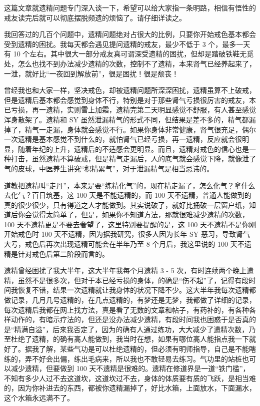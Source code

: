 \documentclass[fontset=founder]{ctexart}
\begin{document}
这篇文章就遗精问题专门深入谈一下，希望可以给大家指一条明路，相信有悟性的戒友读完后就可以彻底摆脱频遗的烦恼了。请仔细详读之。

我回答过的几百个问题中，遗精问题绝对占很大的比例，只要你开始戒色基本都会受到遗精的困扰。我每天都会遇见提问遗精的戒友，最少不低于 3 个，最多一天有 10 个左右。其中很大一部分戒友真可谓深受遗精的困扰，但却是踏破铁鞋无觅处，怎么也找不到办法减少遗精的次数，控制不了遗精，本来肾气已经养起来了，一泄，就好比“一夜回到解放前”，很是困扰！很是颓丧！

曾经我也和大家一样，坚决戒色，却被遗精问题所深深困扰，遗精虽算不上破戒，但是遗精后基本都会感觉到身体不行，特别是对于那些肾气亏损很厉害的戒友，本已亏损，再一遗精，实则雪上加霜，遗精完第二天明显感觉不舒服，有人甚至感觉浑身散架了。遗精和 SY 虽然泄漏精气的形式不同，但结果是差不多的，精气都漏掉了，精气一走漏，身体就会感觉不行。如果你身体非常健康，肾气很充足，偶尔一次遗精是基本感觉不到什么的，就怕肾气已经亏损，再一遗精，反应就会很明显，随着年纪的上升，遗精后的不适感会更明显。而且，遗精对戒色的信心也是一种打击，虽然遗精不算破戒，但是精气走漏后，人的底气就会感觉下降，就像泄了气的皮球，中医养生讲究“积精累气”，对于泄漏精气是相当忌讳的。

道教把遗精叫“走丹”，本来是要“练精化气”的，现在精走漏了，怎么化气？拿什么去化气？百日筑基，这 100 天是不能遗精的，而 100 天不遗精，普通人能做到的真的很少很少，只有得道之人才能做到。其实说破了，就好比捅破一层窗户纸，知道后你会觉得太简单了，但是，如果你不知道方法，那就很难减少遗精的次数，100 天不遗精更是不要去奢望了，这里特别要提醒的是，这 100 天不遗精不是你刚开始戒色时 100 天不遗精，因为据我研究，很多人因为长年 SY 恶习，导致肾气大亏，戒色后再次出现遗精可能会在半年乃至 8 个月后，我这里说的 100 天不遗精是针对戒色后第二阶段而言的。

遗精曾经困扰了我大半年，这大半年我每个月遗精 3 - 5 次，有时连续两个晚上遗精，虽然不是很多次，但对于本已经亏损的身体，的确是“伤不起”了，记得有段时间我恢复不错，结果一次遗精就让我身体的状况下降不少。这大半年我每次遗精都做记录，几月几号遗精的，在几点遗精的，有梦还是无梦，我都做了详细的记录，每次遗精后我都在网上找方法，真是看了无数的文章和帖子，有药补的，有各种各样动作的，有暗示疗法的，但还是没办法减少遗精，有段时间我也困惑于是否真的是“精满自溢”，后来我否定了，因为的确有人通过练功，大大减少了遗精次数，乃至杜绝了遗精，的确有高人能做到，我当时在想，如果有哪位高人能指点我一下就好了。据我了解，某些气功是可以杜绝遗精的，但必须有明师指导，自己是不能瞎练的，弄不好会出偏，练出毛病来，所以我也不敢轻易去练习。气功里的站桩也可以减少遗精，但要做到 100 天不遗精是很难的。遗精在修道界是一道“铁门槛”，不知有多少人过不去这道坎，这道坎过不去，身体的体质要有质的飞跃，是相当难的，因为你补进去的东西，都被你遗精漏掉了，好比水箱，上面放水，下面漏水，这个水箱永远满不了。
\end{document}
